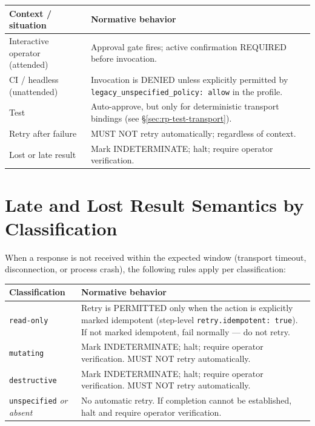 \begin{center}
\begin{longtable}{p{4.5cm}p{9cm}}
\toprule
\textbf{Context / situation} & \textbf{Normative behavior} \\
\midrule
Interactive operator (attended) &
    Approval gate fires; active confirmation REQUIRED before invocation. \\
CI / headless (unattended) &
    Invocation is DENIED unless explicitly permitted by
    \texttt{legacy\_unspecified\_policy: allow} in the profile. \\
Test &
    Auto-approve, but only for deterministic transport bindings
    (see \S\ref{sec:rp-test-transport}). \\
Retry after failure &
    MUST NOT retry automatically; regardless of context. \\
Lost or late result &
    Mark INDETERMINATE; halt; require operator verification. \\
\bottomrule
\end{longtable}
\end{center}

\section{Late and Lost Result Semantics by Classification}
\label{sec:rp-late-result}

When a response is not received within the expected window (transport timeout,
disconnection, or process crash), the following rules apply per classification:

\begin{center}
\begin{longtable}{p{3cm}p{10cm}}
\toprule
\textbf{Classification} & \textbf{Normative behavior} \\
\midrule
\texttt{read-only} &
    Retry is PERMITTED only when the action is explicitly marked idempotent
    (step-level \texttt{retry.idempotent: true}).  If not marked idempotent,
    fail normally — do not retry. \\
\texttt{mutating} &
    Mark INDETERMINATE; halt; require operator verification.
    MUST NOT retry automatically. \\
\texttt{destructive} &
    Mark INDETERMINATE; halt; require operator verification.
    MUST NOT retry automatically. \\
\texttt{unspecified} \emph{or absent} &
    No automatic retry.  If completion cannot be established, halt
    and require operator verification. \\
\bottomrule
\end{longtable}
\end{center}

